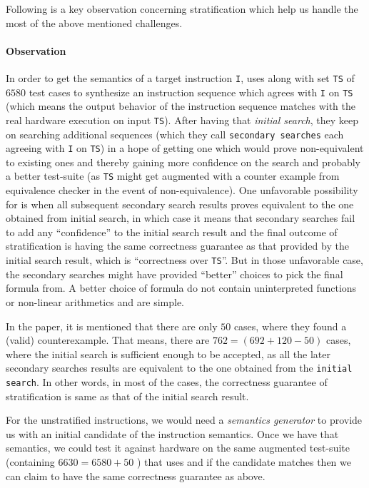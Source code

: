 Following is a key observation concerning stratification which help us handle the most of the above mentioned challenges.

\paragraph{Observation}
     In order to get the semantics of a target instruction {\tt I}, \Strata uses \Stoke along with set {\tt TS} of $6580$ test cases to synthesize an instruction sequence which agrees with {\tt I} on {\tt TS} (which means the output behavior of the instruction sequence matches with the real hardware execution on input {\tt TS}). After having that \emph{initial search}, they keep on searching  additional sequences (which they call {\tt secondary searches} each agreeing with {\tt I} on {\tt TS}) in a hope of getting  one which would prove non-equivalent to existing ones and thereby gaining more confidence on the search and probably a better test-suite (as {\tt TS} might get augmented with a counter example from equivalence checker in the event of non-equivalence). One unfavorable possibility for \Strata is when all subsequent secondary search results proves  equivalent to the one obtained from initial search, in which case it  means that  secondary searches fail to add any ``confidence'' to the initial search result and the final outcome of stratification is having the same correctness guarantee as that provided by the initial search result, which is ``correctness over {\tt TS}''. But in those unfavorable case, the secondary searches might have provided ``better'' choices to pick the final formula from. A better choice of formula do not contain uninterpreted functions or  non-linear arithmetics  and are simple.  
    
   In the paper\cite{Heule2016a}, it is mentioned that there are only $50$ cases, where they found a (valid) counterexample. That means, there are $762 = (692 + 120 - 50)$ cases, where the initial search is sufficient enough to be accepted, as all the later secondary searches results are equivalent to the one obtained from the {\tt initial search}. In other words, in  most of the cases, the correctness guarantee of stratification is same as that of the initial search result. 
   
   For the unstratified instructions, we would need a \emph{semantics generator} to provide us with an initial candidate of the instruction semantics. Once we have that semantics, we could test it against hardware on the same augmented test-suite (containing $6630 = 6580 + 50$ ) that \Stoke uses and if the candidate  matches then we can claim to have the same correctness guarantee as above. 
   
